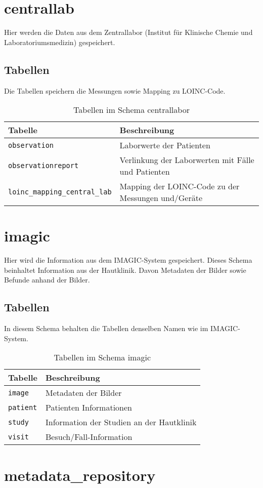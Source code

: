   \section{centrallab}
  Hier werden die Daten aus dem Zentrallabor (Institut für Klinische Chemie und Laboratoriumsmedizin) gespeichert.
  \subsection{Tabellen}
  Die Tabellen speichern die Messungen sowie Mapping zu LOINC-Code.
  \begin{table}[ht]
  	\centering
  	\caption{Tabellen im Schema centrallabor}
  	\begin{tabular}{|| l | l ||}
  		\hline
  		Tabelle & Beschreibung \\[0.5ex]
  		\hline\hline
  		\texttt{observation} & Laborwerte der Patienten \\
  		\hline
  		\texttt{observationreport} & Verlinkung der Laborwerten mit Fälle und Patienten \\
  		\hline
  		\texttt{loinc\_mapping\_central\_lab} & Mapping der LOINC-Code zu der Messungen und/Geräte \\
  		\hline
  	\end{tabular}
  \end{table}

\section{imagic}
Hier wird die Information aus dem IMAGIC-System gespeichert. Dieses Schema beinhaltet Information aus der Hautklinik. Davon Metadaten der Bilder sowie Befunde anhand der Bilder.
\subsection{Tabellen}
In diesem Schema behalten die Tabellen denselben Namen wie im IMAGIC-System. 
\begin{table}[ht]
	\centering   
	\caption{Tabellen im Schema imagic}
	\begin{tabular}{||l|l||}   		
		\hline
		Tabelle & Beschreibung \\ [0.5ex]
		\hline\hline
		\texttt{image} & Metadaten der Bilder \\
		\hline
		\texttt{patient} & Patienten Informationen \\
		\hline
		\texttt{study} & Information der Studien an der Hautklinik \\
		\hline
		\texttt{visit} &  Besuch/Fall-Information\\
		\hline
	\end{tabular}
\end{table}

  \section{metadata\_repository}